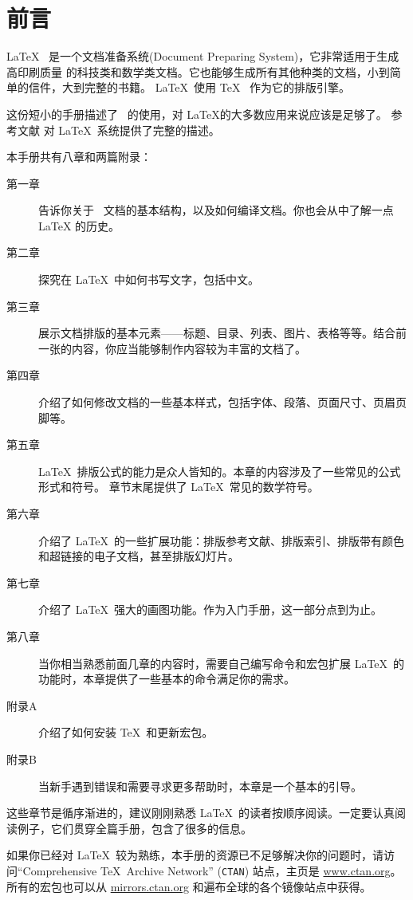 \chapter{前言}

\LaTeX\ \cite{manual} 是一个文档准备系统(Document Preparing System)，它非常适用于生成高印刷质量
的科技类和数学类文档。它也能够生成所有其他种类的文档，小到简单的信件，大到完整的书籍。
\LaTeX~使用 \TeX\ \cite{texbook} 作为它的排版引擎。%

这份短小的手册描述了 \LaTeXe\ 的使用，对 \LaTeX 的大多数应用来说应该是足够了。
参考文献 \cite{manual,companion} 对 \LaTeX\ 系统提供了完整的描述。%

\bigskip

本手册共有八章和两篇附录：%
\begin{description}%
\item[第一章] 告诉你关于 \LaTeXe\ 文档的基本结构，以及如何编译文档。你也会从中了解一点 \LaTeX{} 的历史。
\item[第二章] 探究在 \LaTeX\ 中如何书写文字，包括中文。%
\item[第三章] 展示文档排版的基本元素——标题、目录、列表、图片、表格等等。结合前一张的内容，你应当能够制作内容较为丰富的文档了。%
\item[第四章] 介绍了如何修改文档的一些基本样式，包括字体、段落、页面尺寸、页眉页脚等。
\item[第五章] \LaTeX\ 排版公式的能力是众人皆知的。本章的内容涉及了一些常见的公式形式和符号。
              章节末尾提供了 \LaTeX\ 常见的数学符号。%
\item[第六章] 介绍了 \LaTeX\ 的一些扩展功能：排版参考文献、排版索引、排版带有颜色和超链接的电子文档，甚至排版幻灯片。
\item[第七章] 介绍了 \LaTeX\ 强大的画图功能。作为入门手册，这一部分点到为止。
\item[第八章] 当你相当熟悉前面几章的内容时，需要自己编写命令和宏包扩展 \LaTeX\ 的功能时，本章提供了一些基本的命令满足你的需求。
\end{description}%
\begin{description}
\item[附录A] 介绍了如何安装 \TeX\ 和更新宏包。
\item[附录B] 当新手遇到错误和需要寻求更多帮助时，本章是一个基本的引导。
\end{description}

\bigskip
这些章节是循序渐进的，建议刚刚熟悉 \LaTeX\ 的读者按顺序阅读。一定要认真阅读例子，它们贯穿全篇手册，包含了很多的信息。%

\bigskip
如果你已经对 \LaTeX\ 较为熟练，本手册的资源已不足够解决你的问题时，请访问``Comprehensive
\TeX\ Archive Network'' (\texttt{CTAN}) 站点，主页是 \url{www.ctan.org}。
所有的宏包也可以从 \url{mirrors.ctan.org} 和遍布全球的各个镜像站点中获得。

